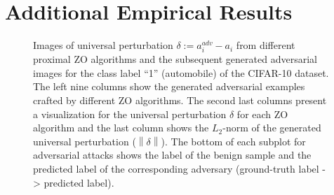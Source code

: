 \documentclass[iicol,sn-basic]{sn-jnl}
\theoremstyle{thmstyleone}%
\theoremstyle{thmstyletwo}%
\theoremstyle{thmstylethree}%
\newcommand{\norm}[1]{\left\lVert#1\right\rVert}
\begin{document}
\section{Additional Empirical Results}
\begin{figure}[!ht]
%
\setlength{\abovecaptionskip}{2pt}
\caption{Images of universal perturbation $\delta := a_i^{adv} - a_i$ from different proximal ZO algorithms and the subsequent generated adversarial images for the class label ``1'' (automobile) of the CIFAR-10 dataset. The left nine columns show the generated adversarial examples crafted by different ZO algorithms. The second last columns present a visualization for the universal perturbation $\delta$ for each ZO algorithm and the last column shows the $L_2$-norm of the generated universal perturbation ($\norm{\delta}$). The bottom of each subplot for adversarial attacks shows the label of the benign sample and the predicted label of the corresponding adversary (ground-truth label -> predicted label).}
\label{attack-perturbs-cifar-fig}
\end{figure}
% 
%
%
\end{document}
